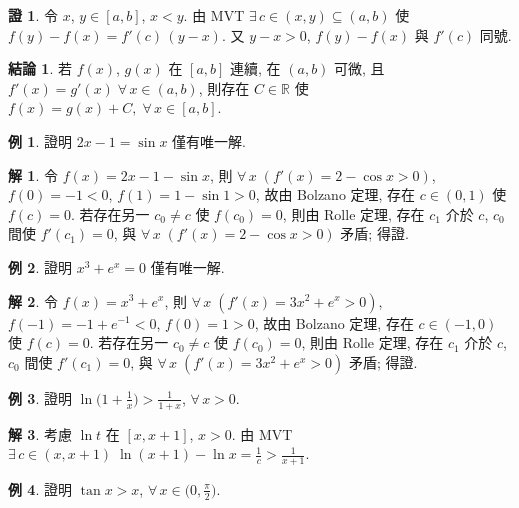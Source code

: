\documentclass[12pt]{extarticle}
\newcommand{\ds}{\displaystyle}
\theoremstyle{definition}
\newtheorem*{fact}{結論}
\newtheorem*{ex}{例}
\newtheorem*{sol}{解}
\newtheorem*{prf}{證}
\begin{document}
\begin{prf}
  令 $\ds x$, $y\in[a, b]$, $x < y$. 由 MVT $\ds\exists\,c\in(x, y)\subseteq(a, b)$ 使 $\ds f(y) - f(x) = f'(c)\,(y - x)$. 又 $y - x > 0$, $f(y) - f(x)$ 與 $f'(c)$ 同號.  
\end{prf}

\begin{fact}
  若 $f(x)$, $g(x)$ 在 $[a, b]$ 連續, 在 $(a, b)$ 可微, 且 $f'(x) = g'(x)\;\forall\,x\in(a, b)$, 則存在 $C\in\mathbb{R}$ 使 $f(x) = g(x) + C,\;\forall\,x\in[a, b]$. 
\end{fact}

\begin{ex}
  證明 $\ds 2x - 1 = \sin x$ 僅有唯一解. 
\end{ex}

\begin{sol}
  令 $\ds f(x) = 2 x - 1 - \sin x$, 則 $\ds\forall\,x\;(f'(x) = 2 - \cos x > 0)$, $f(0) = -1 < 0$, $f(1) = 1 - \sin 1 > 0$, 故由 Bolzano 定理, 存在 $\ds c\in(0, 1)$ 使 $f(c) = 0$. 若存在另一 $c_0\ne c$ 使 $f(c_0) = 0$, 則由 Rolle 定理, 存在 $c_1$ 介於 $c$, $c_0$ 間使 $f'(c_1) = 0$, 與 $\ds\forall\,x\;(f'(x) = 2 - \cos x > 0)$ 矛盾; 得證. 
\end{sol}

\begin{ex}
  證明 $\ds x^3 + e^x = 0$ 僅有唯一解. 
\end{ex}

\begin{sol}
  令 $\ds f(x) = x^3 + e^x$, 則 $\ds\forall\,x\;(f'(x) = 3 x^2 + e^x > 0)$, $f(-1) = -1 + e^{-1} < 0$, $f(0) = 1 > 0$, 故由 Bolzano 定理, 存在 $\ds c\in(-1, 0)$ 使 $f(c) = 0$. 若存在另一 $c_0\ne c$ 使 $f(c_0) = 0$, 則由 Rolle 定理, 存在 $c_1$ 介於 $c$, $c_0$ 間使 $f'(c_1) = 0$, 與 $\ds\forall\,x\;(f'(x) = 3 x^2 + e^x > 0)$ 矛盾; 得證. 
\end{sol}

\begin{ex}
  證明 $\ds\ln\big(1 + \frac{1}{x}\big) > \frac{1}{1 + x}$, $\forall\,x > 0$. 
\end{ex}

\begin{sol}
  考慮 $\ds\ln t$ 在 $\ds[x, x + 1]$, $\ds x > 0$. 由 MVT $\ds\exists\,c\in(x, x + 1)\;\ln(x + 1) - \ln x = \frac{1}{c} > \frac{1}{x + 1}$. 
\end{sol}

\begin{ex}
  證明 $\ds\tan x > x$, $\ds\forall\,x\in\big(0, \frac{\pi}{2}\big)$. 
\end{ex}
\end{document}
